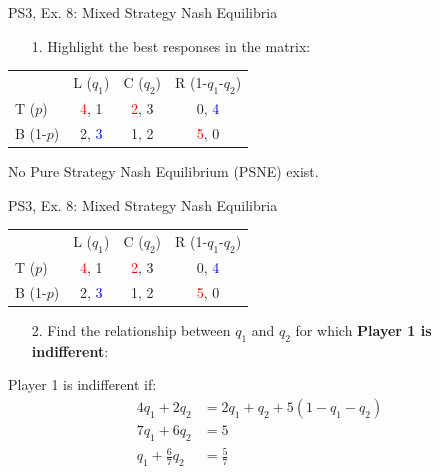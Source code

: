 \begin{frame}{PS3, Ex. 8: Mixed Strategy Nash Equilibria}
  \begin{multicols}{2}
    \begin{itemize}
      \item[1.] Highlight the best responses in the matrix:
    \end{itemize}
    \begin{table}
      \begin{tabular}{l|c|c|c|}
          \multicolumn{1}{c}{}  & \multicolumn{1}{c}{L ($q_1$)} & \multicolumn{1}{c}{C ($q_2$)} & \multicolumn{1}{c}{R (1-$q_1$-$q_2$)} \\\cline{2-4}
          T ($p$)   & \textcolor{red}{4}, 1 & \textcolor{red}{2}, 3 & 0, \textcolor{blue}{4} \\\cline{2-4}
          B (1-$p$) & 2, \textcolor{blue}{3} & 1, 2 & \textcolor{red}{5}, 0 \\\cline{2-4}
      \end{tabular}
    \end{table}
    No Pure Strategy Nash Equilibrium (PSNE) exist.
  \vfill\null \columnbreak
  \vfill\null
  \end{multicols}
\end{frame}
\begin{frame}{PS3, Ex. 8: Mixed Strategy Nash Equilibria}
  \begin{multicols}{2}
    \begin{table}
      \begin{tabular}{l|c|c|c|}
          \multicolumn{1}{c}{}  & \multicolumn{1}{c}{L ($q_1$)} & \multicolumn{1}{c}{C ($q_2$)} & \multicolumn{1}{c}{R (1-$q_1$-$q_2$)} \\\cline{2-4}
          T ($p$)   & \textcolor{red}{4}, 1 & \textcolor{red}{2}, 3 & 0, \textcolor{blue}{4} \\\cline{2-4}
          B (1-$p$) & 2, \textcolor{blue}{3} & 1, 2 & \textcolor{red}{5}, 0 \\\cline{2-4}
      \end{tabular}
    \end{table}
    \begin{itemize}
      \item[2.] Find the relationship between $q_1$ and $q_2$ for which \textbf{Player 1 is indifferent}:
    \end{itemize}
    Player 1 is indifferent if:
    \begin{align*}
      4q_1 + 2q_2 &= 2q_1 + q_2 + 5(1-q_1-q_2)\\
      7q_1 + 6q_2 &= 5 \\
      q_1 + \frac{6}{7}q_2 &= \frac{5}{7}
    \end{align*}
  \vfill\null \columnbreak
  \vfill\null
  \end{multicols}
\end{frame}
